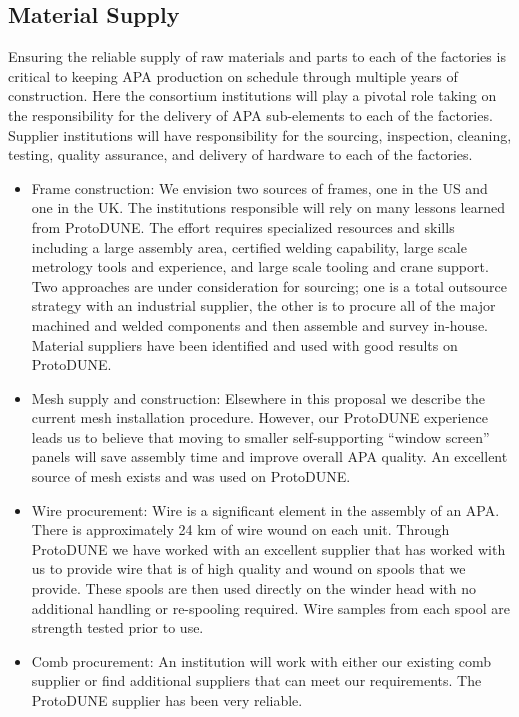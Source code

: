 \subsection{Material Supply}  

Ensuring the reliable supply of raw materials and parts to each of the factories is critical to keeping APA production on schedule through multiple years of construction. Here the consortium institutions will play a pivotal role taking on the responsibility for the delivery of APA sub-elements to each of the factories. Supplier institutions will have responsibility for the sourcing, inspection, cleaning, testing, quality assurance, and delivery of hardware to each of the factories. 

\begin{itemize}
\item Frame construction: We envision two sources of frames, one in the US and one in the UK. The institutions responsible will rely on many lessons learned from ProtoDUNE. The effort requires specialized resources and skills including a large assembly area, certified welding capability, large scale metrology tools and experience, and large scale tooling and crane support. Two approaches are under consideration for sourcing; one is a total outsource strategy with an industrial supplier, the other is to procure all of the major machined and welded components and then assemble and survey in-house. Material suppliers have been identified and used with good results on ProtoDUNE.
\item Mesh supply and construction: Elsewhere in this proposal we describe the current mesh installation procedure. However, our ProtoDUNE experience leads us to believe that moving to smaller self-supporting ``window screen'' panels will save assembly time and improve overall APA quality. An excellent source of mesh exists and was used on ProtoDUNE.
\item Wire procurement: Wire is a significant element in the assembly of an APA. There is approximately 24 km of wire wound on each unit. Through ProtoDUNE we have worked with an excellent supplier that has worked with us to provide wire that is of high quality and wound on spools that we provide. These spools are then used directly on the winder head with no additional handling or re-spooling required. Wire samples from each spool are strength tested prior to use.
\item Comb procurement: An institution will work with either our existing comb supplier or find additional suppliers that can meet our requirements. The ProtoDUNE supplier has been very reliable.

\end{itemize}
